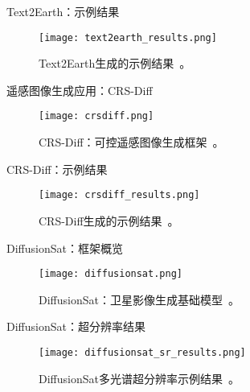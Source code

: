   \begin{refsection}
    \begin{frame}{Text2Earth：示例结果}
      \begin{figure}
        \centering
        \texttt{[image: text2earth\_results.png]}
        \caption[]{\scriptsize Text2Earth生成的示例结果~\parencite{text2earth2025}。}
      \end{figure}
      \bottomleftrefs
    \end{frame}
  \end{refsection}
  
  \begin{refsection}
  \begin{frame}{遥感图像生成应用：CRS-Diff}
    \begin{figure}
      \centering
      \texttt{[image: crsdiff.png]}
      \caption[]{\scriptsize CRS-Diff：可控遥感图像生成框架~\parencite{tang2024crsdiff}。}
    \end{figure}
    \bottomleftrefs
  \end{frame}
  \end{refsection}
  
  \begin{refsection}
  \begin{frame}{CRS-Diff：示例结果}
    \begin{figure}
      \centering
      \texttt{[image: crsdiff\_results.png]}
      \caption[]{\scriptsize CRS-Diff生成的示例结果~\parencite{tang2024crsdiff}。}
    \end{figure}
    \bottomleftrefs
  \end{frame}
  \end{refsection}
  
  \begin{refsection}
  \begin{frame}{DiffusionSat：框架概览}
    \begin{figure}
      \centering
      \texttt{[image: diffusionsat.png]}
      \caption[]{\scriptsize DiffusionSat：卫星影像生成基础模型~\parencite{diffusionset2024}。}
    \end{figure}
    \bottomleftrefs
  \end{frame}
  \end{refsection}
  
  \begin{refsection}
  \begin{frame}{DiffusionSat：超分辨率结果}
    \begin{figure}
      \centering
      \texttt{[image: diffusionsat\_sr\_results.png]}
      \caption[]{\scriptsize DiffusionSat多光谱超分辨率示例结果~\parencite{diffusionset2024}。}
    \end{figure}
    \bottomleftrefs
  \end{frame}
  \end{refsection}
  
